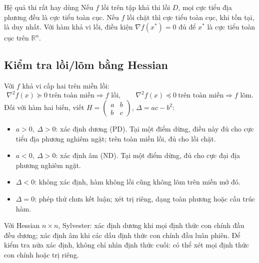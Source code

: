 \documentclass[11pt,a4paper]{article}
\newcommand{\R}{\mathbb{R}}
\newcommand{\grad}{\nabla}
\newcommand{\Hess}{\nabla^2}
\begin{document}
\begin{keybox}{Hệ quả thi rất hay dùng}
Nếu \(f\) lồi trên tập khả thi lồi \(D\), mọi cực tiểu địa phương đều là cực tiểu toàn cục. Nếu \(f\) lồi chặt thì cực tiểu toàn cục, khi tồn tại, là duy nhất. Với hàm khả vi lồi, điều kiện \(\grad f(x^\ast)=0\) đủ để \(x^\ast\) là cực tiểu toàn cục trên \(\R^n\).
\end{keybox}

\subsection{Kiểm tra lồi/lõm bằng Hessian}
Với \(f\) khả vi cấp hai trên miền lồi:
\[
\Hess f(x)\succeq0\ \text{trên toàn miền}\Rightarrow f\text{ lồi},\qquad
\Hess f(x)\preceq0\ \text{trên toàn miền}\Rightarrow f\text{ lõm}.
\]
Đối với hàm hai biến, viết \(H=\begin{pmatrix}a&b\\b&c\end{pmatrix}\), \(\Delta=ac-b^2\):
\begin{itemize}
\item \(a>0,\ \Delta>0\): xác định dương (PD). Tại một điểm dừng, điều này đủ cho cực tiểu địa phương nghiêm ngặt; trên toàn miền lồi, đủ cho lồi chặt.
\item \(a<0,\ \Delta>0\): xác định âm (ND). Tại một điểm dừng, đủ cho cực đại địa phương nghiêm ngặt.
\item \(\Delta<0\): không xác định, hàm không lồi cũng không lõm trên miền mở đó.
\item \(\Delta=0\): phép thử chưa kết luận; xét trị riêng, dạng toàn phương hoặc cấu trúc hàm.
\end{itemize}
Với Hessian \(n\times n\), Sylvester: xác định dương khi mọi định thức con chính đầu đều dương; xác định âm khi các dấu định thức con chính đầu luân phiên. Để kiểm tra nửa xác định, không chỉ nhìn định thức cuối: có thể xét mọi định thức con chính hoặc trị riêng.

\clearpage
\end{document}
